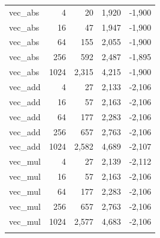 \begin{center}
\begin{longtable}{l r r r r}
vec_abs & 4 & 20 & 1,920 & -1,900 \\ 
vec_abs & 16 & 47 & 1,947 & -1,900 \\ 
vec_abs & 64 & 155 & 2,055 & -1,900 \\ 
vec_abs & 256 & 592 & 2,487 & -1,895 \\ 
vec_abs & 1024 & 2,315 & 4,215 & -1,900 \\ 
vec_add & 4 & 27 & 2,133 & -2,106 \\ 
vec_add & 16 & 57 & 2,163 & -2,106 \\ 
vec_add & 64 & 177 & 2,283 & -2,106 \\ 
vec_add & 256 & 657 & 2,763 & -2,106 \\ 
vec_add & 1024 & 2,582 & 4,689 & -2,107 \\ 
vec_mul & 4 & 27 & 2,139 & -2,112 \\ 
vec_mul & 16 & 57 & 2,163 & -2,106 \\ 
vec_mul & 64 & 177 & 2,283 & -2,106 \\ 
vec_mul & 256 & 657 & 2,763 & -2,106 \\ 
vec_mul & 1024 & 2,577 & 4,683 & -2,106 \\ 
\hline\n\end{longtable}
\end{center}
